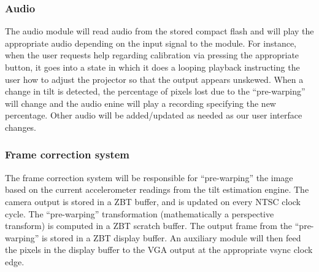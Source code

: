 \documentclass{article}
\begin{document}
\subsubsection{Audio}
The audio module will read audio from the stored compact flash and will play the appropriate audio depending on the input signal to the module.
For instance, when the user requests help regarding calibration via pressing the appropriate button,
it goes into a state in which it does a looping playback instructing the user how to adjust the projector so that the output appears unskewed.
When a change in tilt is detected,
the percentage of pixels lost due to the ``pre-warping'' will change and the audio enine will play a recording specifying the new percentage.
Other audio will be added/updated as needed as our user interface changes.

\subsubsection{Frame correction system}
The frame correction system will be responsible for ``pre-warping'' the image based on the current accelerometer readings from the tilt estimation engine.
The camera output is stored in a ZBT buffer, and is updated on every NTSC clock cycle.
The ``pre-warping'' transformation (mathematically a perspective transform) is computed in a ZBT scratch buffer.
The output frame from the ``pre-warping'' is stored in a ZBT display buffer.
An auxiliary module will then feed the pixels in the display buffer to the VGA output at the appropriate vsync clock edge.
\end{document}
